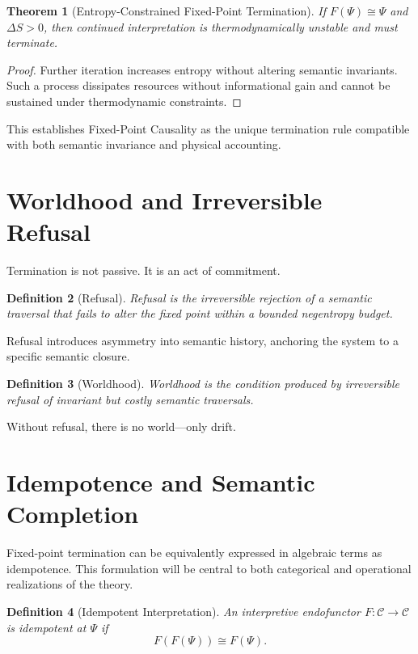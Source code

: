 \documentclass[12pt]{article}
\newtheorem{theorem}{Theorem}[section]
\newtheorem{definition}[theorem]{Definition}
\theoremstyle{remark}
\begin{document}
\begin{theorem}[Entropy-Constrained Fixed-Point Termination]
If $F(\Psi) \cong \Psi$ and $\Delta S > 0$, then continued interpretation is thermodynamically unstable and must terminate.
\end{theorem}

\begin{proof}
Further iteration increases entropy without altering semantic invariants. Such a process dissipates resources without informational gain and cannot be sustained under thermodynamic constraints.
\end{proof}

This establishes Fixed-Point Causality as the unique termination rule compatible with both semantic invariance and physical accounting.

\section{Worldhood and Irreversible Refusal}

Termination is not passive. It is an act of commitment.

\begin{definition}[Refusal]
Refusal is the irreversible rejection of a semantic traversal that fails to alter the fixed point within a bounded negentropy budget.
\end{definition}

Refusal introduces asymmetry into semantic history, anchoring the system to a specific semantic closure.

\begin{definition}[Worldhood]
Worldhood is the condition produced by irreversible refusal of invariant but costly semantic traversals.
\end{definition}

Without refusal, there is no world—only drift.

\section{Idempotence and Semantic Completion}

Fixed-point termination can be equivalently expressed in algebraic terms as idempotence. This formulation will be central to both categorical and operational realizations of the theory.

\begin{definition}[Idempotent Interpretation]
An interpretive endofunctor $F : \mathcal{C} \to \mathcal{C}$ is idempotent at $\Psi$ if
\[
F(F(\Psi)) \cong F(\Psi).
\]
\end{definition}
\end{document}
